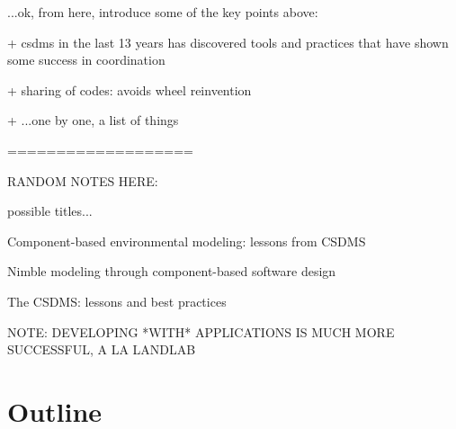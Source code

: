 \documentclass[12pt]{amsart}
\begin{document}
...ok, from here, introduce some of the key points above:

+ csdms in the last 13 years has discovered tools and practices that have shown some success in coordination

+ sharing of codes: avoids wheel reinvention

+ ...one by one, a list of things

















 













===================

RANDOM NOTES HERE:

possible titles...

Component-based environmental modeling: lessons from CSDMS

Nimble modeling through component-based software design

The CSDMS: lessons and best practices



NOTE: DEVELOPING *WITH* APPLICATIONS IS MUCH MORE SUCCESSFUL, A LA LANDLAB




\section*{Outline}
\end{document}
